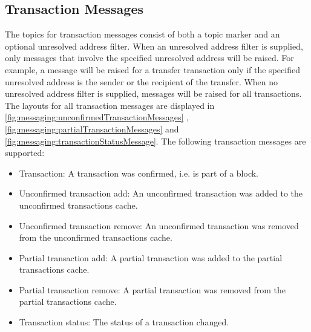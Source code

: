 \begin{figure}[H]
\end{figure}

\subsection{Transaction Messages}

The topics for transaction messages consist of both a topic marker and an optional unresolved address filter.
When an unresolved address filter is supplied, only messages that involve the specified unresolved address will be raised.
For example, a message will be raised for a transfer transaction only if the specified unresolved address is the sender or the recipient of the transfer.
When no unresolved address filter is supplied, messages will be raised for all transactions.
The layouts for all transaction messages are displayed in \autoref{fig:messaging:unconfirmedTransactionMessages} , \autoref{fig:messaging:partialTransactionMessages} and \autoref{fig:messaging:transactionStatusMessage}.
The following transaction messages are supported:

\begin{itemize}
	\item{Transaction: A transaction was confirmed, i.e. is part of a block.}
	\item{Unconfirmed transaction add: An unconfirmed transaction was added to the unconfirmed transactions cache.}
	\item{Unconfirmed transaction remove: An unconfirmed transaction was removed from the unconfirmed transactions cache.}
	\item{Partial transaction add: A partial transaction was added to the partial transactions cache.}
	\item{Partial transaction remove: A partial transaction was removed from the partial transactions cache.}
	\item{Transaction status: The status of a transaction changed.}
\end{itemize}

